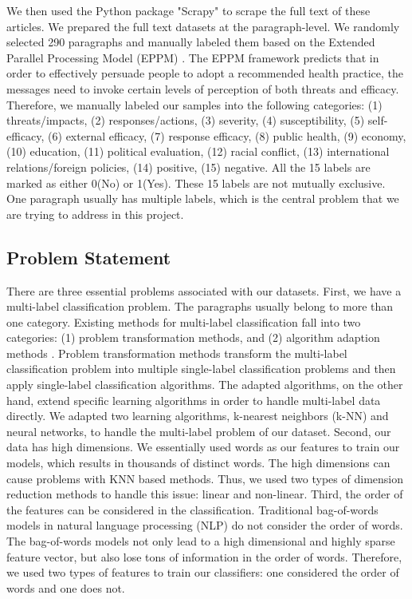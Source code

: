 \documentclass[11pt]{article}
\begin{document}
We then used the Python package "Scrapy" to scrape the full text of these articles. We prepared the full text datasets at the paragraph-level. We randomly selected 290 paragraphs and manually labeled them based on the Extended Parallel Processing Model (EPPM) \cite{witte1992putting, witte1994fear}. The EPPM framework predicts that in order to effectively persuade people to adopt a recommended health practice, the messages need to invoke certain levels of perception of both threats and efficacy. Therefore, we manually labeled our samples into the following categories: (1) threats/impacts, (2) responses/actions, (3) severity, (4) susceptibility, (5) self-efficacy, (6) external efficacy, (7) response efficacy, (8) public health, (9) economy, (10) education, (11) political evaluation, (12) racial conflict, (13) international relations/foreign policies, (14) positive, (15) negative. All the 15 labels are marked as either 0(No) or 1(Yes). These 15 labels are not mutually exclusive. One paragraph usually has multiple labels, which is the central problem that we are trying to address in this project.

\subsection{Problem Statement}

There are three essential problems associated with our datasets. First, we have a multi-label classification problem. The paragraphs usually belong to more than one category. Existing methods for multi-label classification fall into two categories: (1) problem transformation methods, and (2) algorithm adaption methods \cite{tsoumakas2007multi}. Problem transformation methods transform the multi-label classification problem into multiple single-label classification problems and then apply single-label classification algorithms. The adapted algorithms, on the other hand, extend specific learning algorithms in order to handle multi-label data directly. We adapted two learning algorithms, k-nearest neighbors (k-NN) and neural networks, to handle the multi-label problem of our dataset. Second, our data has high dimensions. We essentially used words as our features to train our models, which results in thousands of distinct words. The high dimensions can cause problems with KNN based methods. Thus, we used two types of dimension reduction methods to handle this issue: linear and non-linear. Third, the order of the features can be considered in the classification. Traditional bag-of-words models in natural language processing (NLP) do not consider the order of words. The bag-of-words models not only lead to a high dimensional and highly sparse feature vector, but also lose tons of information in the order of words. Therefore, we used two types of features to train our classifiers: one considered the order of words and one does not. 
\end{document}
